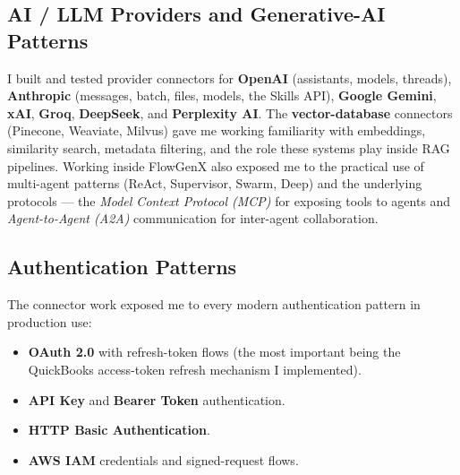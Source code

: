 \subsection{AI / LLM Providers and Generative-AI Patterns}
I built and tested provider connectors for \textbf{OpenAI}
(assistants, models, threads), \textbf{Anthropic} (messages, batch,
files, models, the Skills API), \textbf{Google Gemini},
\textbf{xAI}, \textbf{Groq}, \textbf{DeepSeek}, and
\textbf{Perplexity AI}. The \textbf{vector-database} connectors
(Pinecone, Weaviate, Milvus) gave me working familiarity with
embeddings, similarity search, metadata filtering, and the role
these systems play inside RAG pipelines. Working inside FlowGenX
also exposed me to the practical use of multi-agent patterns
(ReAct, Supervisor, Swarm, Deep) and the underlying protocols ---
the \emph{Model Context Protocol (MCP)} for exposing tools to
agents and \emph{Agent-to-Agent (A2A)} communication for inter-agent
collaboration.

\subsection{Authentication Patterns}
The connector work exposed me to every modern authentication pattern
in production use:

\begin{itemize}[leftmargin=*]
    \item \textbf{OAuth 2.0} with refresh-token flows (the most
    important being the QuickBooks access-token refresh mechanism I
    implemented).
    \item \textbf{API Key} and \textbf{Bearer Token} authentication.
    \item \textbf{HTTP Basic Authentication}.
    \item \textbf{AWS IAM} credentials and signed-request flows.
\end{itemize}

